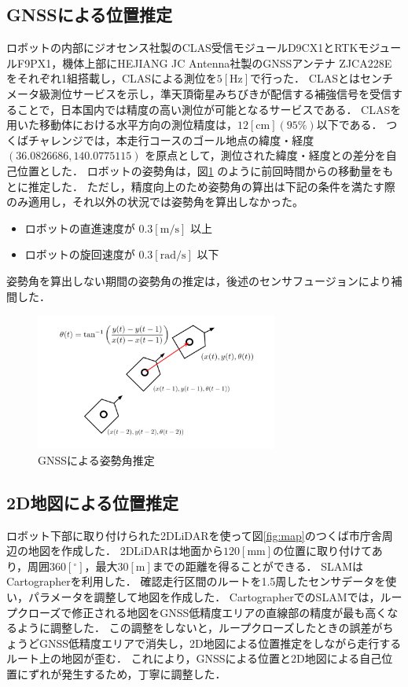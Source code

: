 \documentclass[platex,dvipdfmx]{rbproceedings}
\begin{document}
\subsection{GNSSによる位置推定}\label{ss:gnss_localization}
ロボットの内部にジオセンス社製のCLAS受信モジュールD9CX1とRTKモジュールF9PX1，機体上部にHEJIANG JC Antenna社製のGNSSアンテナ ZJCA228Eをそれぞれ1組搭載し，CLASによる測位を$5 [ \mathrm{Hz} ]$で行った．
CLASとはセンチメータ級測位サービスを示し，準天頂衛星みちびきが配信する補強信号を受信することで，日本国内では精度の高い測位が可能となるサービスである．
CLASを用いた移動体における水平方向の測位精度は，$12[\mathrm{cm}] (95 \%)$以下である．
つくばチャレンジでは，本走行コースのゴール地点の緯度・経度 $(36.0826686 ,140.0775115)$ を原点として，測位された緯度・経度との差分を自己位置とした．
ロボットの姿勢角は，図\ref{fig:gnss_orientaiton} のように前回時間からの移動量をもとに推定した．
ただし，精度向上のため姿勢角の算出は下記の条件を満たす際のみ適用し，それ以外の状況では姿勢角を算出しなかった。
\begin{itemize}
    \item ロボットの直進速度が $0.3[\mathrm{m/s}]$ 以上
    \item ロボットの旋回速度が $0.3[\mathrm{rad/s}]$ 以下
\end{itemize}
姿勢角を算出しない期間の姿勢角の推定は，後述のセンサフュージョンにより補間した．


\begin{figure}[htbp]
    \centering   
    \includegraphics[keepaspectratio,width=80mm]{fig/gnss_orientation.png}
    \caption{GNSSによる姿勢角推定}
    \label{fig:gnss_orientaiton}
\end{figure}

\subsection{2D地図による位置推定}\label{ss:map_localization}
ロボット下部に取り付けられた2DLiDARを使って図\ref{fig:map}のつくば市庁舎周辺の地図を作成した．
2DLiDARは地面から$120 [ \mathrm{mm}]$の位置に取り付けてあり，周囲$360[ ^\circ ]$，最大$30[ \mathrm{m}]$までの距離を得ることができる．
SLAMはCartographer\cite{cartographer}を利用した．
確認走行区間のルートを1.5周したセンサデータを使い，パラメータを調整して地図を作成した．
CartographerでのSLAMでは，ループクローズで修正される地図をGNSS低精度エリアの直線部の精度が最も高くなるように調整した．
この調整をしないと，ループクローズしたときの誤差がちょうどGNSS低精度エリアで消失し，2D地図による位置推定をしながら走行するルート上の地図が歪む．
これにより，GNSSによる位置と2D地図による自己位置にずれが発生するため，丁寧に調整した．
\end{document}
